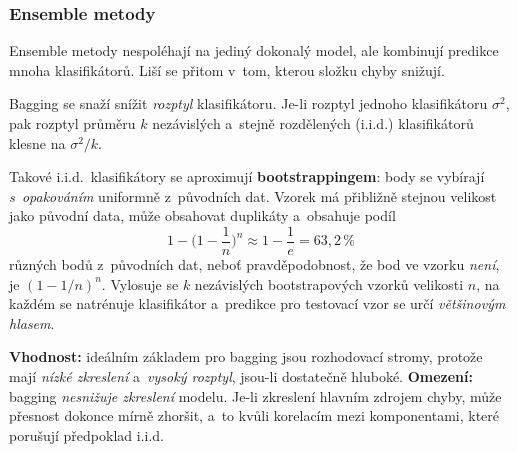 \documentclass[11pt,a4paper]{article}
\theoremstyle{definition}
\begin{document}
\subsubsection{Ensemble metody}

Ensemble metody nespoléhají na jediný dokonalý model, ale kombinují predikce mnoha
klasifikátorů. Liší se přitom v~tom, kterou složku chyby snižují.

\begin{defbox}
Bagging se snaží snížit \emph{rozptyl} klasifikátoru. Je-li rozptyl jednoho klasifikátoru
$\sigma^2$, pak rozptyl průměru $k$ nezávislých a~stejně rozdělených (i.i.d.) klasifikátorů
klesne na $\sigma^2/k$.

Takové i.i.d.\ klasifikátory se aproximují \textbf{bootstrappingem}: body se vybírají
\emph{s~opakováním} uniformně z~původních dat. Vzorek má přibližně stejnou velikost jako
původní data, může obsahovat duplikáty a~obsahuje podíl
\[ 1-\Big(1-\frac1n\Big)^{\!n}\approx 1-\frac1e=63{,}2\,\% \]
různých bodů z~původních dat, neboť pravděpodobnost, že bod ve vzorku \emph{není}, je
$(1-1/n)^n$. Vylosuje se $k$ nezávislých bootstrapových vzorků velikosti $n$, na každém se
natrénuje klasifikátor a~predikce pro testovací vzor se určí \emph{většinovým hlasem}.

\textbf{Vhodnost:} ideálním základem pro bagging jsou rozhodovací stromy, protože mají
\emph{nízké zkreslení} a~\emph{vysoký rozptyl}, jsou-li dostatečně hluboké.
\textbf{Omezení:} bagging \emph{nesnižuje zkreslení} modelu. Je-li zkreslení hlavním zdrojem
chyby, může přesnost dokonce mírně zhoršit, a~to kvůli korelacím mezi komponentami, které
porušují předpoklad i.i.d.
\end{defbox}
\end{document}

